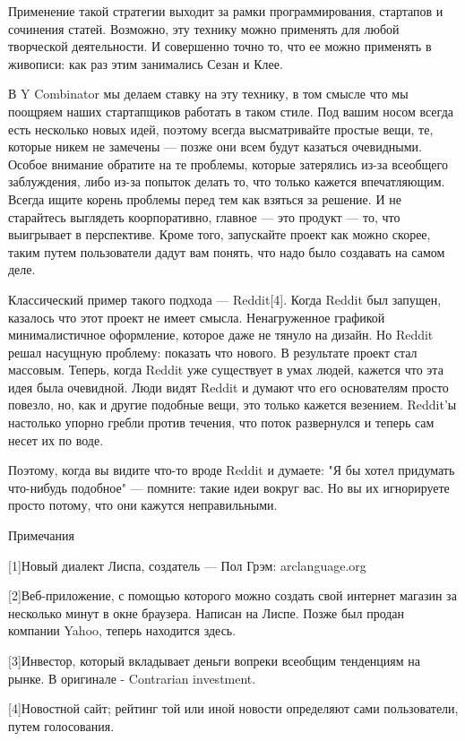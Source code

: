 \documentclass[ebook,12pt,oneside,openany]{memoir}
\begin{document}
Применение такой стратегии выходит за рамки программирования,
стартапов и сочинения статей. Возможно, эту технику можно применять
для любой творческой деятельности. И совершенно точно то, что ее можно
применять в живописи: как раз этим занимались Сезан и Клее.

В Y Combinator мы делаем ставку на эту технику, в том смысле что мы
поощряем наших стартапщиков работать в таком стиле. Под вашим носом
всегда есть несколько новых идей, поэтому всегда высматривайте простые
вещи, те, которые никем не замечены — позже они всем будут казаться
очевидными. Особое внимание обратите на те проблемы, которые
затерялись из-за всеобщего заблуждения, либо из-за попыток делать то,
что только кажется впечатляющим. Всегда ищите корень проблемы перед
тем как взяться за решение. И не старайтесь выглядеть коорпоративно,
главное — это продукт — то, что выигрывает в перспективе. Кроме того,
запускайте проект как можно скорее, таким путем пользователи дадут вам
понять, что надо было создавать на самом деле.

Классический пример такого подхода — Reddit[4]. Когда Reddit был
запущен, казалось что этот проект не имеет смысла. Ненагруженное
графикой минималистичное оформление, которое даже не тянуло на дизайн.
Но Reddit решал насущную проблему: показать что нового. В результате
проект стал массовым. Теперь, когда Reddit уже существует в умах
людей, кажется что эта идея была очевидной. Люди видят Reddit и думают
что его основателям просто повезло, но, как и другие подобные вещи,
это только кажется везением. Reddit'ы настолько упорно гребли против
течения, что поток развернулся и теперь сам несет их по воде.

Поэтому, когда вы видите что-то вроде Reddit и думаете: "Я бы хотел
придумать что-нибудь подобное" — помните: такие идеи вокруг вас. Но вы
их игнорируете просто потому, что они кажутся неправильными.

Примечания

[1]Новый диалект Лиспа, создатель — Пол Грэм: arclanguage.org

[2]Веб-приложение, с помощью которого можно создать свой интернет
магазин за несколько минут в окне браузера. Написан на Лиспе. Позже
был продан компании Yahoo, теперь находится здесь.

[3]Инвестор, который вкладывает деньги вопреки всеобщим тенденциям на
рынке. В оригинале - Contrarian investment.

[4]Новостной сайт; рейтинг той или иной новости определяют сами
пользователи, путем голосования.
\end{document}
